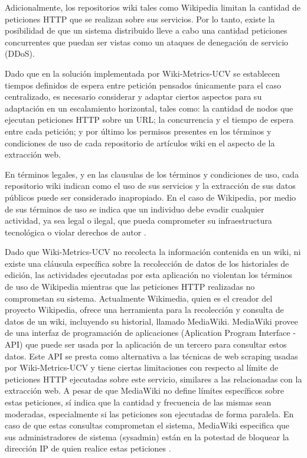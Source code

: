 Adicionalmente, los repositorios wiki tales como Wikipedia limitan la cantidad de peticiones HTTP que se 
realizan sobre sus servicios. Por lo tanto, existe la posibilidad de que
un sistema distribuido lleve a cabo una cantidad peticiones concurrentes que puedan
ser vistas como un ataques de denegación de servicio (DDoS).

Dado que en la solución implementada por Wiki-Metrics-UCV se establecen tiempos definidos
de espera entre petición pensados únicamente para el caso centralizado, es necesario
considerar y adaptar ciertos aspectos para su adaptación en un escalamiento horizontal,
tales como: la cantidad de nodos que ejecutan peticiones HTTP sobre un URL; la
concurrencia y el tiempo de espera entre cada petición; y por último los permisos
presentes en los términos y condiciones de uso de cada repositorio de artículos wiki en
el aspecto de la extracción web.

En términos legales, y en las clausulas de los términos y condiciones de uso, cada repositorio
wiki indican como el uso de sus servicios y la extracción de sus datos públicos puede ser considerado
inapropiado. En el caso de Wikipedia, por medio de sus términos de uso se indica que un individuo debe 
evadir cualquier actividad, ya sea legal o ilegal, que pueda comprometer su infraestructura tecnológica o 
violar derechos de autor \cite{7}. 

Dado que Wiki-Metrics-UCV no recolecta la información contenida en un wiki, ni
existe una cláusula específica sobre la recolección de datos de los historiales de edición,
las actividades ejecutadas por esta aplicación no violentan los términos de uso de
Wikipedia mientras que las peticiones HTTP realizadas no comprometan su sistema.
Actualmente Wikimedia, quien es el creador del proyecto Wikipedia, ofrece una
herramienta para la recolección y consulta de datos de un wiki, incluyendo su historial,
llamado MediaWiki. MediaWiki provee de una interfaz de programación de aplicaciones
(Aplication Program Interface - API) que puede ser usada por la aplicación de un tercero
para consultar estos datos. Este API se presta como alternativa a las técnicas de
web scraping usadas por Wiki-Metrics-UCV y tiene ciertas limitaciones con respecto al límite
de peticiones HTTP ejecutadas sobre este servicio, similares a las relacionadas con la
extracción web. A pesar de que MediaWiki no define límites específicos sobre estas
peticiones, sí indica que la cantidad y frecuencia de las mismas sean moderadas,
especialmente si las peticiones son ejecutadas de forma paralela. En caso de que estas
consultas comprometan el sistema, MediaWiki especifica que sus administradores de
sistema (sysadmin) están en la potestad de bloquear la dirección IP de quien realice
estas peticiones \cite{8}.

